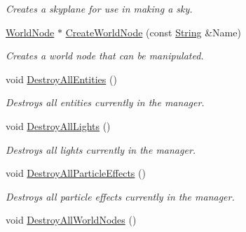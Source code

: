 \begin{DoxyCompactItemize}
\begin{DoxyCompactList}\small\item\em Creates a skyplane for use in making a sky. \item\end{DoxyCompactList}\item 
\hyperlink{classMezzanine_1_1WorldNode}{WorldNode} $\ast$ \hyperlink{classMezzanine_1_1SceneManager_a0b10c04c8d89926c8a7a0cf21da5a293}{CreateWorldNode} (const \hyperlink{namespaceMezzanine_acf9fcc130e6ebf08e3d8491aebcf1c86}{String} \&Name)
\begin{DoxyCompactList}\small\item\em Creates a world node that can be manipulated. \item\end{DoxyCompactList}\item 
\hypertarget{classMezzanine_1_1SceneManager_a7c2637be3ad7af57f2cc194f305e87ff}{
void \hyperlink{classMezzanine_1_1SceneManager_a7c2637be3ad7af57f2cc194f305e87ff}{DestroyAllEntities} ()}
\label{classMezzanine_1_1SceneManager_a7c2637be3ad7af57f2cc194f305e87ff}

\begin{DoxyCompactList}\small\item\em Destroys all entities currently in the manager. \item\end{DoxyCompactList}\item 
\hypertarget{classMezzanine_1_1SceneManager_a4dbe2f8c34aef587c263dd99a6d65e61}{
void \hyperlink{classMezzanine_1_1SceneManager_a4dbe2f8c34aef587c263dd99a6d65e61}{DestroyAllLights} ()}
\label{classMezzanine_1_1SceneManager_a4dbe2f8c34aef587c263dd99a6d65e61}

\begin{DoxyCompactList}\small\item\em Destroys all lights currently in the manager. \item\end{DoxyCompactList}\item 
\hypertarget{classMezzanine_1_1SceneManager_a4c54c954577f43a57c5164a0fb7e31cc}{
void \hyperlink{classMezzanine_1_1SceneManager_a4c54c954577f43a57c5164a0fb7e31cc}{DestroyAllParticleEffects} ()}
\label{classMezzanine_1_1SceneManager_a4c54c954577f43a57c5164a0fb7e31cc}

\begin{DoxyCompactList}\small\item\em Destroys all particle effects currently in the manager. \item\end{DoxyCompactList}\item 
\hypertarget{classMezzanine_1_1SceneManager_af30ec6d5ad5260dd9eb986305afe9181}{
void \hyperlink{classMezzanine_1_1SceneManager_af30ec6d5ad5260dd9eb986305afe9181}{DestroyAllWorldNodes} ()}
\label{classMezzanine_1_1SceneManager_af30ec6d5ad5260dd9eb986305afe9181}


\end{DoxyCompactItemize}
